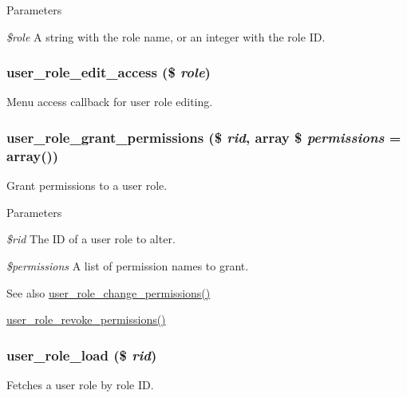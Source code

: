 \begin{DoxyParams}{Parameters}
\item[{\em \$role}]A string with the role name, or an integer with the role ID. \end{DoxyParams}
\hypertarget{user_8module_a41a44a0043d57e6c56c651fd9060b4af}{
\subsubsection[{user\_\-role\_\-edit\_\-access}]{\setlength{\rightskip}{0pt plus 5cm}user\_\-role\_\-edit\_\-access (\$ {\em role})}}
\label{user_8module_a41a44a0043d57e6c56c651fd9060b4af}
Menu access callback for user role editing. \hypertarget{user_8module_aee75b0b96b7cec455cb0245275469aaf}{
\subsubsection[{user\_\-role\_\-grant\_\-permissions}]{\setlength{\rightskip}{0pt plus 5cm}user\_\-role\_\-grant\_\-permissions (\$ {\em rid}, \/  array \$ {\em permissions} = {\ttfamily array()})}}
\label{user_8module_aee75b0b96b7cec455cb0245275469aaf}
Grant permissions to a user role.


\begin{DoxyParams}{Parameters}
\item[{\em \$rid}]The ID of a user role to alter. \item[{\em \$permissions}]A list of permission names to grant.\end{DoxyParams}
\begin{DoxySeeAlso}{See also}
\hyperlink{user_8module_a99fd9206a99c083a3f7ee09ba0c4a9ea}{user\_\-role\_\-change\_\-permissions()} 

\hyperlink{user_8module_a5b4cb135247dfac81c93c8da05bcd514}{user\_\-role\_\-revoke\_\-permissions()} 
\end{DoxySeeAlso}
\hypertarget{user_8module_a523043011b1e6d3f168ee7a5e8674734}{
\subsubsection[{user\_\-role\_\-load}]{\setlength{\rightskip}{0pt plus 5cm}user\_\-role\_\-load (\$ {\em rid})}}
\label{user_8module_a523043011b1e6d3f168ee7a5e8674734}
Fetches a user role by role ID.


